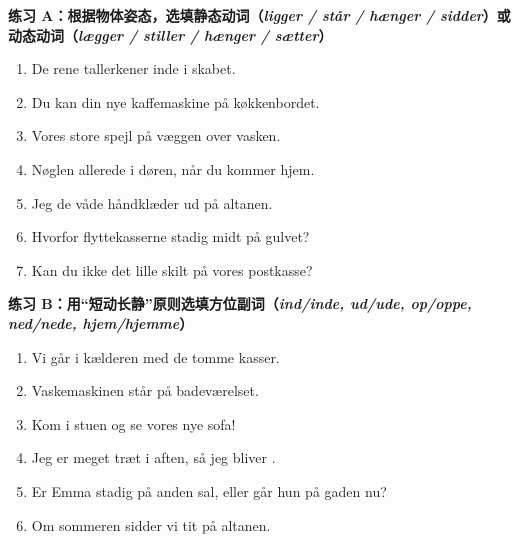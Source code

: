 
\textbf{练习 A：根据物体姿态，选填静态动词（\textit{ligger / står / hænger / sidder}）或动态动词（\textit{lægger / stiller / hænger / sætter}）}
\begin{enumerate}
  \item De rene tallerkener \underline{\hspace{2.0cm}} inde i skabet.
  \item Du kan \underline{\hspace{2.0cm}} din nye kaffemaskine på køkkenbordet.
  \item Vores store spejl \underline{\hspace{2.0cm}} på væggen over vasken.
  \item Nøglen \underline{\hspace{2.0cm}} allerede i døren, når du kommer hjem.
  \item Jeg \underline{\hspace{2.0cm}} de våde håndklæder ud på altanen.
  \item Hvorfor \underline{\hspace{2.0cm}} flyttekasserne stadig midt på gulvet?
  \item Kan du ikke \underline{\hspace{2.0cm}} det lille skilt på vores postkasse?
\end{enumerate}

\textbf{练习 B：用“短动长静”原则选填方位副词（\textit{ind/inde, ud/ude, op/oppe, ned/nede, hjem/hjemme}）}
\begin{enumerate}
  \item Vi går \underline{\hspace{1.8cm}} i kælderen med de tomme kasser.
  \item Vaskemaskinen står \underline{\hspace{1.8cm}} på badeværelset.
  \item Kom \underline{\hspace{1.8cm}} i stuen og se vores nye sofa!
  \item Jeg er meget træt i aften, så jeg bliver \underline{\hspace{1.8cm}}.
  \item Er Emma stadig \underline{\hspace{1.8cm}} på anden sal, eller går hun \underline{\hspace{1.8cm}} på gaden nu?
  \item Om sommeren sidder vi tit \underline{\hspace{1.8cm}} på altanen.
\end{enumerate}


